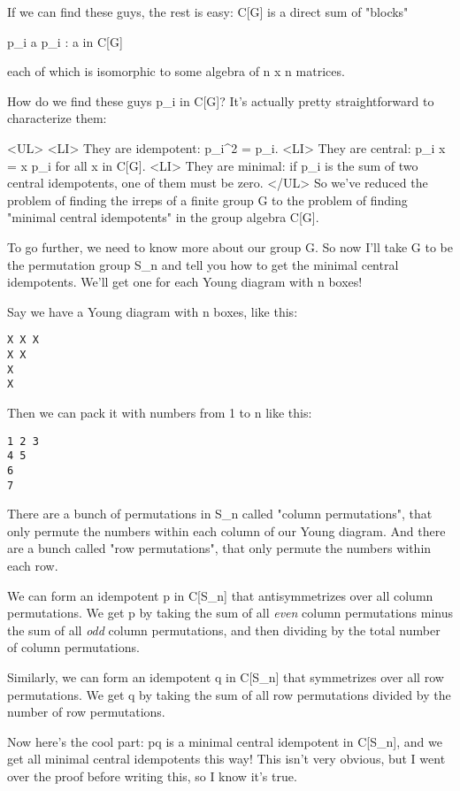 If we can find these guys, the rest is easy: C[G] is a direct sum of
"blocks"

                    {p_{i} a p_{i} : a in C[G]}

each of which is isomorphic to some algebra of n x n matrices.

How do we find these guys p_{i} in C[G]?  It's actually pretty
straightforward to characterize them:

<UL>
<LI> They are idempotent: p_{i}^{2} = p_{i}.
<LI> They are central: p_{i} x = x p_{i} for all x in C[G].
<LI> They are minimal: if p_{i} is the sum of two central idempotents, one 
   of them must be zero.
</UL>
So we've reduced the problem of finding the irreps of a finite group G
to the problem of finding "minimal central idempotents" in the group 
algebra C[G].

To go further, we need to know more about our group G.  So now I'll take
G to be the permutation group S_{n} and tell you how to get the minimal
central idempotents.  We'll get one for each Young diagram with n boxes!

Say we have a Young diagram with n boxes, like this:

\begin{verbatim}
X X X
X X
X
X
\end{verbatim}
    
Then we can pack it with numbers from 1 to n like this:

\begin{verbatim}
1 2 3
4 5
6
7
\end{verbatim}
    
There are a bunch of permutations in S_{n} called "column
permutations", that only permute the numbers within each column of
our Young diagram.  And there are a bunch called "row
permutations", that only permute the numbers within each row.

We can form an idempotent p in C[S_{n}] that antisymmetrizes over all 
column permutations.  We get p by taking the sum of all \emph{even} column
permutations minus the sum of all \emph{odd} column permutations, and then
dividing by the total number of column permutations.

Similarly, we can form an idempotent q in C[S_{n}] that
symmetrizes over all row permutations.  We get q by taking the sum of
all row permutations divided by the number of row permutations.

Now here's the cool part: pq is a minimal central idempotent in
C[S_{n}], and we get all minimal central idempotents this way!
This isn't very obvious, but I went over the proof before writing this,
so I know it's true.

